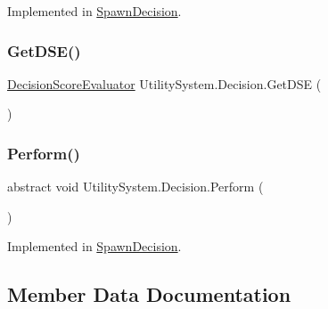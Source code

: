 Implemented in \mbox{\hyperlink{class_spawn_decision_a8c2019e64b2353e9c0eb314cc0e804d7}{Spawn\+Decision}}.

\mbox{\label{class_utility_system_1_1_decision_a7a544c6d16e25998e64d89d510ab7733}} 
\subsubsection{\texorpdfstring{Get\+D\+S\+E()}{GetDSE()}}
{\footnotesize\ttfamily \mbox{\hyperlink{class_utility_system_1_1_decision_score_evaluator}{Decision\+Score\+Evaluator}} Utility\+System.\+Decision.\+Get\+D\+SE (\begin{DoxyParamCaption}{ }\end{DoxyParamCaption})}

\mbox{\label{class_utility_system_1_1_decision_a055dcaafb617365bc8b16bb9acba6575}} 
\subsubsection{\texorpdfstring{Perform()}{Perform()}}
{\footnotesize\ttfamily abstract void Utility\+System.\+Decision.\+Perform (\begin{DoxyParamCaption}{ }\end{DoxyParamCaption})\hspace{0.3cm}{\ttfamily [pure virtual]}}



Implemented in \mbox{\hyperlink{class_spawn_decision_a7f943d8fd313e6a38f26b223e4b4dba7}{Spawn\+Decision}}.



\subsection{Member Data Documentation}
\mbox{\label{class_utility_system_1_1_decision_ac898590add80a922e0dea64906a536fc}} 
